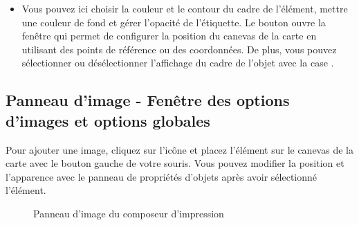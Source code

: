 \begin{itemize}[label=--]
\item Vous pouvez ici choisir la couleur et le contour du cadre de l'élément, mettre une couleur de fond et gérer l'opacité de l'étiquette. Le bouton  ouvre la fenêtre  qui permet de configurer la position du canevas de la carte en utilisant des points de référence ou des coordonnées. De plus, vous pouvez sélectionner ou désélectionner l'affichage du cadre de l'objet avec la case .
\end{itemize}

\subsection{Panneau d'image - Fenêtre des options d'images et options globales}

Pour ajouter une image, cliquez sur l'icône  et placez l'élément sur le canevas de la carte avec le bouton gauche de votre souris. Vous pouvez modifier la position et l'apparence avec le panneau de propriétés d'objets après avoir sélectionné l'élément.

\begin{figure}[ht]
\centering
     \hspace{1cm}
   \caption{Panneau d'image du composeur d'impression \nixcaption}\label{fig:imageoptions}
\end{figure}

